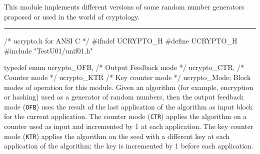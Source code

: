 
This module implements different versions of some random number generators
proposed or used in the world of cryptology.

\newcommand{\aes}{\textrm{AES}}
\newcommand{\shaun}{\mbox{\textrm{SHA-1}}}
\newcommand{\calh}{{H}}
\newcommand{\cale}{{E}}


\bigskip
\hrule
\code\hide
/*  ucrypto.h  for ANSI C  */
#ifndef UCRYPTO_H
#define UCRYPTO_H
\endhide
#include "TestU01/unif01.h"


typedef enum {
   ucrypto_OFB,                 /* Output Feedback mode */
   ucrypto_CTR,                 /* Counter mode */
   ucrypto_KTR                  /* Key counter mode */
   } ucrypto_Mode;
\endcode
 \tab  Block modes of operation \cite{rDWO01a} for this module. Given an algorithm
  (for example, encryption or hashing) used as a generator of random numbers, then
  the output feedback mode (\texttt{OFB}) uses the result of the last application
  of the algorithm as input block for the current application. The counter
   mode (\texttt{CTR}) applies the algorithm on a counter used as input and
  incremented by 1 at each application.  The key counter mode (\texttt{KTR})
  applies the algorithm on the seed with a different key at each application of
  the algorithm; the key is incremented by 1 before each application.
 \endtab
\code


